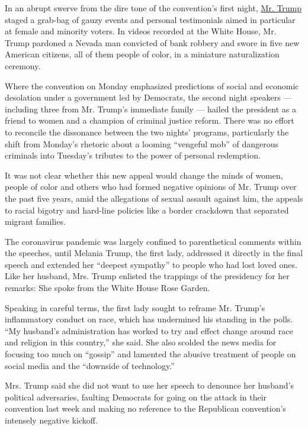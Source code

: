 In an abrupt swerve from the dire tone of the convention's first night,
\href{https://www.nytimes3xbfgragh.onion/2020/08/26/us/politics/rnc-trump-character.html}{Mr.
Trump} staged a grab-bag of gauzy events and personal testimonials aimed
in particular at female and minority voters. In videos recorded at the
White House, Mr. Trump pardoned a Nevada man convicted of bank robbery
and swore in five new American citizens, all of them people of color, in
a miniature naturalization ceremony.

Where the convention on Monday emphasized predictions of social and
economic desolation under a government led by Democrats, the second
night speakers --- including three from Mr. Trump's immediate family ---
hailed the president as a friend to women and a champion of criminal
justice reform. There was no effort to reconcile the dissonance between
the two nights' programs, particularly the shift from Monday's rhetoric
about a looming ``vengeful mob'' of dangerous criminals into Tuesday's
tributes to the power of personal redemption.

It was not clear whether this new appeal would change the minds of
women, people of color and others who had formed negative opinions of
Mr. Trump over the past five years, amid the allegations of sexual
assault against him, the appeals to racial bigotry and hard-line
policies like a border crackdown that separated migrant families.

The coronavirus pandemic was largely confined to parenthetical comments
within the speeches, until Melania Trump, the first lady, addressed it
directly in the final speech and extended her ``deepest sympathy'' to
people who had lost loved ones. Like her husband, Mrs. Trump enlisted
the trappings of the presidency for her remarks: She spoke from the
White House Rose Garden.

Speaking in careful terms, the first lady sought to reframe Mr. Trump's
inflammatory conduct on race, which has undermined his standing in the
polls. ``My husband's administration has worked to try and effect change
around race and religion in this country,'' she said. She also scolded
the news media for focusing too much on ``gossip'' and lamented the
abusive treatment of people on social media and the ``downside of
technology.''

Mrs. Trump said she did not want to use her speech to denounce her
husband's political adversaries, faulting Democrats for going on the
attack in their convention last week and making no reference to the
Republican convention's intensely negative kickoff.

